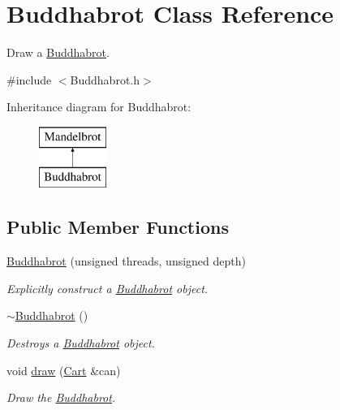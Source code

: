 \hypertarget{class_buddhabrot}{}\section{Buddhabrot Class Reference}
\label{class_buddhabrot}


Draw a \hyperlink{class_buddhabrot}{Buddhabrot}.  




{\ttfamily \#include $<$Buddhabrot.\+h$>$}

Inheritance diagram for Buddhabrot\+:\begin{figure}[H]
\begin{center}
\leavevmode
\includegraphics[height=2.000000cm]{class_buddhabrot}
\end{center}
\end{figure}
\subsection*{Public Member Functions}
\begin{DoxyCompactItemize}
\item 
\hyperlink{class_buddhabrot_a3785536aee5b43aac307c8c737d0a1bb}{Buddhabrot} (unsigned threads, unsigned depth)
\begin{DoxyCompactList}\small\item\em Explicitly construct a \hyperlink{class_buddhabrot}{Buddhabrot} object. \end{DoxyCompactList}\item 
\hyperlink{class_buddhabrot_ad54bede3c44cc5d9181bd6a28feb0dbd}{$\sim$\+Buddhabrot} ()
\begin{DoxyCompactList}\small\item\em Destroys a \hyperlink{class_buddhabrot}{Buddhabrot} object. \end{DoxyCompactList}\item 
void \hyperlink{class_buddhabrot_a9e65eb7e2cac8737aedec56a7e2c274c}{draw} (\hyperlink{classtsgl_1_1_cartesian_canvas}{Cart} \&can)
\begin{DoxyCompactList}\small\item\em Draw the \hyperlink{class_buddhabrot}{Buddhabrot}. \end{DoxyCompactList}\end{DoxyCompactItemize}
